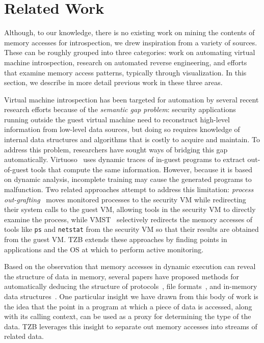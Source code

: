 \section{Related Work}
\label{sec:relwork}

Although, to our knowledge, there is no existing work on mining the
contents of memory accesses for introspection, we drew inspiration from
a variety of sources. These can be roughly grouped into three
categories: work on automating virtual machine introspection, research
on automated reverse engineering, and efforts that examine memory access
patterns, typically through visualization. In this section, we describe
in more detail previous work in these three areas.

Virtual machine introspection has been targeted for automation by
several recent research efforts because of the \emph{semantic gap
problem}: security applications running outside the guest virtual
machine need to reconstruct high-level information from low-level data
sources, but doing so requires knowledge of internal data structures and
algorithms that is costly to acquire and maintain. To address this
problem, researchers have sought ways of bridging this gap
automatically. Virtuoso~\cite{Dolan-Gavitt:2011uq} uses dynamic traces
of in-guest programs to extract out-of-guest tools that compute the same
information. However, because it is based on dynamic analysis,
incomplete training may cause the generated programs to malfunction. Two
related approaches attempt to address this limitation: \emph{process
out-grafting}~\cite{Srinivasan:2011fk} moves monitored processes to the
security VM while redirecting their system calls to the guest VM,
allowing tools in the security VM to directly examine the process, while
VMST~\cite{Fu:2012fk} selectively redirects the memory accesses of tools
like \texttt{ps} and \texttt{netstat} from the security VM so that their
results are obtained from the guest VM. TZB extends these approaches by
finding points in applications and the OS at which to perform active
monitoring.

Based on the observation that memory accesses in dynamic execution can
reveal the structure of data in memory, several papers have proposed
methods for automatically deducing the structure of
protocols~\cite{Caballero:2007fk,Lin:2008uq,Cui:2007kx}, file
formats~\cite{Cui:2008ys,Lin:2008vn}, and in-memory data
structures~\cite{Lee:2011,Slowinska:2011ys,Lin:2010}. One particular
insight we have drawn from this body of work is the idea that the point
in a program at which a piece of data is accessed, along with its
calling context, can be used as a proxy for determining the type of the
data. TZB leverages this insight to separate out memory accesses into
streams of related data.

